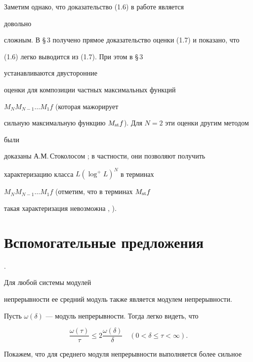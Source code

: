 Заметим однако, что доказательство (1.6) в работе \cite{Guz1} является 


довольно 


сложным. В \S\,3 получено прямое доказательство оценки (1.7) и показано, что 


(1.6) легко выводится из (1.7). При этом в \S\,3 


устанавливаются двусторонние 


оценки для композиции частных максимальных функций 


$M_N M_{N-1}\dots M_1f$ (которая мажорирует 


сильную максимальную функцию $M_{\operatorname{st}} f$). Для $N=2$ эти оценки другим методом 


были 


доказаны А.М.\,Стоколосом \cite{Sto}; в частности, они позволяют получить 


характеризацию класса $L(\log^+ L)^N$ в терминах 


$M_N M_{N-1}\dots M_1f$ (отметим, что в терминах $M_{\operatorname{st}} f$ 


такая характеризация невозможна \cite{Gog}, \cite{Bag}). 


 


\section{Вспомогательные предложения} 


 


\begin{lem} \cite{Kol3}.


Для любой системы модулей


непрерывности ее средний модуль также является модулем непрерывности. 


\end{lem} 


 


Пусть $\omega(\delta)$ --- модуль непрерывности. Тогда легко видеть, что 


\begin{equation} 


\frac{\omega(\tau)}{\tau} \le 2\frac{\omega(\delta)}{\delta}\quad 


(0<\delta\le\tau<\infty). 


\end{equation} 


Покажем, что для среднего модуля непрерывности выполняется более сильное 


